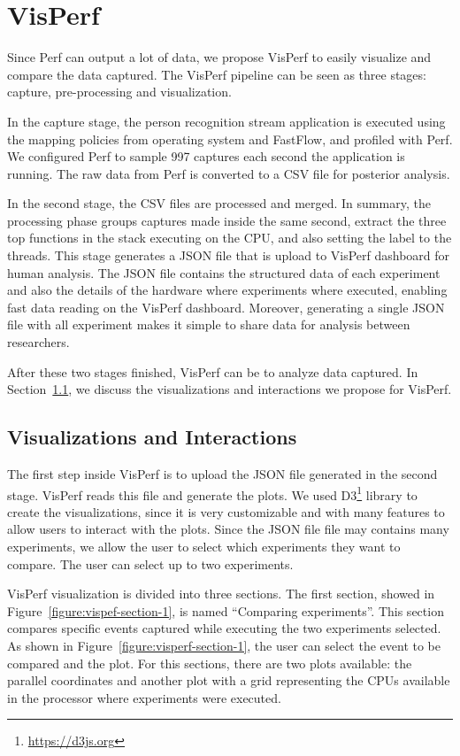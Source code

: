 \section{VisPerf}

Since Perf can output a lot of data, we propose VisPerf to easily visualize and compare the data captured. The VisPerf pipeline can be seen as three stages: capture, pre-processing and visualization.

In the capture stage, the person recognition stream application is executed using the mapping policies from operating system and FastFlow, and profiled with Perf. We configured Perf to sample 997 captures each second the application is running. The raw data from Perf is converted to a CSV file for posterior analysis.

In the second stage, the CSV files are processed and merged. In summary, the processing phase groups captures made inside the same second, extract the three top functions in the stack executing on the CPU, and also setting the label to the threads. This stage generates a JSON file that is upload to VisPerf dashboard for human analysis. The JSON file contains the structured data of each experiment and also the details of the hardware where experiments where executed, enabling fast data reading on the VisPerf dashboard. Moreover, generating a single JSON file with all experiment makes it simple to share data for analysis between researchers.

After these two stages finished, VisPerf can be to analyze data captured. In Section~\ref{section:visualization-interaction}, we discuss the visualizations and interactions we propose for VisPerf.


\subsection{Visualizations and Interactions} \label{section:visualization-interaction}

The first step inside VisPerf is to upload the JSON file generated in the second stage. VisPerf reads this file and generate the plots. We used D3\footnote{\url{https://d3js.org}} library to create the visualizations, since it is very customizable and with many features to allow users to interact with the plots. Since the JSON file file may contains many experiments, we allow the user to select which experiments they want to compare. The user can select up to two experiments.

VisPerf visualization is divided into three sections. The first section, showed in Figure~\ref{figure:vispef-section-1}, is named ``Comparing experiments''. This section compares specific events captured while executing the two experiments selected. As shown in Figure~\ref{figure:visperf-section-1}, the user can select the event to be compared and the plot. For this sections, there are two plots available: the parallel coordinates and another plot with a grid representing the CPUs available in the processor where experiments were executed.

